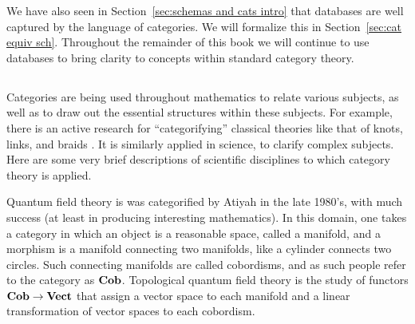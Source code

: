 \documentclass[CT4S-EN-RU]{subfiles}
\begin{document}
\begin{blockENG}
We have also seen in Section~\ref{sec:schemas and cats intro} that databases are well captured by the language of categories. We will formalize this in Section~\ref{sec:cat equiv sch}. Throughout the remainder of this book we will continue to use databases to bring clarity to concepts within standard category theory. 
\end{blockENG}

\begin{blockRUS}
\end{blockRUS}


\subsection{} 

\begin{blockENG}
Categories are being used throughout mathematics to relate various subjects, as well as to draw out the essential structures within these subjects. For example, there is an active research for “categorifying” classical theories like that of knots, links, and braids \cite{Kho}. It is similarly applied in science, to clarify complex subjects. Here are some very brief descriptions of scientific disciplines to which category theory is applied.
\end{blockENG}

\begin{blockRUS}
\end{blockRUS}

\begin{blockENG}
Quantum field theory is was categorified by Atiyah \cite{Ati} in the late 1980's, with much success (at least in producing interesting mathematics). In this domain, one takes a category in which an object is a reasonable space, called a manifold, and a morphism is a manifold connecting two manifolds, like a cylinder connects two circles. Such connecting manifolds are called cobordisms, and as such people refer to the category as ${\mathbf{Cob}}$. Topological quantum field theory is the study of functors ${\mathbf{Cob}}\rightarrow{\mathbf{Vect}}$ that assign a vector space to each manifold and a linear transformation of vector spaces to each cobordism. 
\end{blockENG}

\begin{blockRUS}
\end{blockRUS}
\end{document}
